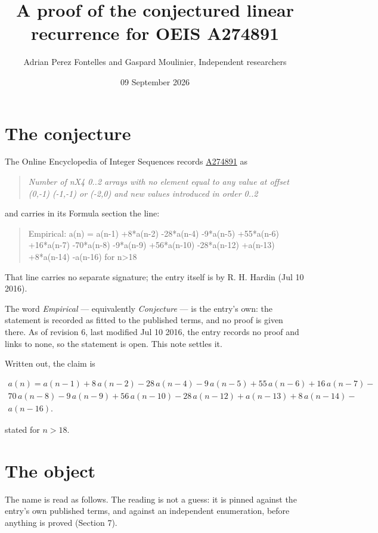 \documentclass[11pt]{article}
\title{A proof of the conjectured linear recurrence for OEIS A274891}
\author{Adrian Perez Fontelles and Gaspard Moulinier, Independent researchers}
\date{09 September 2026}
\theoremstyle{definition}
\begin{document}
\maketitle
\section{The conjecture}

The Online Encyclopedia of Integer Sequences records \href{https://oeis.org/A274891}{A274891} as

\begin{quote}\itshape Number of nX4 0..2 arrays with no element equal to any value at offset (0,-1) (-1,-1) or (-2,0) and new values introduced in order 0..2\end{quote}

and carries in its Formula section the line:

\begin{quote}\ttfamily Empirical: a(n) = a(n-1) +8*a(n-2) -28*a(n-4) -9*a(n-5) +55*a(n-6) +16*a(n-7) -70*a(n-8) -9*a(n-9) +56*a(n-10) -28*a(n-12) +a(n-13) +8*a(n-14) -a(n-16) for n>18\end{quote}

That line carries no separate signature; the entry itself is by R. H. Hardin (Jul 10 2016).

The word {\itshape Empirical} --- equivalently {\itshape Conjecture} --- is the entry's own: the statement is recorded as fitted to the published terms, and no proof is given there. As of revision 6, last modified Jul 10 2016, the entry records no proof and links to none, so the statement is open. This note settles it.

Written out, the claim is

\begin{multline*} a(n) = a(n-1) + 8\,a(n-2) - 28\,a(n-4) - 9\,a(n-5) + 55\,a(n-6) + 16\,a(n-7) - \\ 70\,a(n-8) - 9\,a(n-9) + 56\,a(n-10) - 28\,a(n-12) + a(n-13) + 8\,a(n-14) - \\ a(n-16). \end{multline*}

stated for $n > 18$.

\section{The object}

The name is read as follows. The reading is not a guess: it is pinned against the entry's own published terms, and against an independent enumeration, before anything is proved (Section 7).
\end{document}
